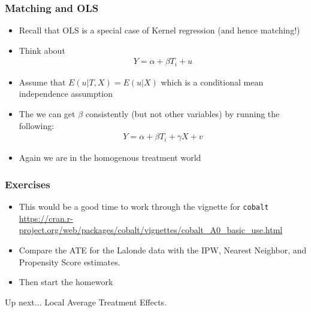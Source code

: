 \documentclass[xcolor=pdftex,dvipsnames,table,mathserif,aspectratio=169]{beamer}
\begin{document}
\begin{frame}
\frametitle{Matching and OLS}
\begin{itemize}
\item Recall that OLS is a special case of Kernel regression (and hence matching!)
\item Think about
\begin{eqnarray*}
Y  = \alpha + \beta T_i + u
\end{eqnarray*}
\item Assume that $E(u | T,X) = E(u | X)$ which is a conditional mean independence assumption
\item The we can get $\beta$ consistently (but not other variables) by running the following:
\begin{eqnarray*}
Y = \alpha + \beta T_i + \gamma X + v
\end{eqnarray*}
\item Again we are in the homogenous treatment world
\end{itemize}
\end{frame}


\begin{frame}
\frametitle{Exercises}
\begin{itemize}
\item This would be a good time to work through the vignette for \texttt{cobalt}
 \url{https://cran.r-project.org/web/packages/cobalt/vignettes/cobalt_A0_basic_use.html}
 \item Compare the ATE for the Lalonde data with the IPW, Nearest Neighbor, and Propensity Score estimates.
 \item Then start the homework
\end{itemize}
\end{frame}


\begin{frame}{Up next...}
Local Average Treatment Effects.
\end{frame}
\end{document}
